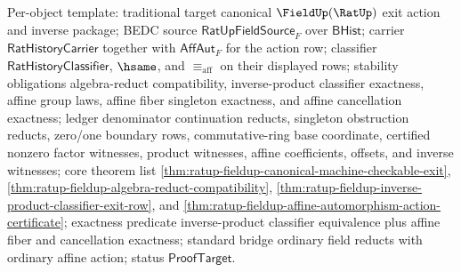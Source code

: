 Per-object template: traditional target canonical $\FieldUp(\RatUp)$ exit action
and inverse package; BEDC source $\mathsf{RatUpFieldSource}_F$ over
$\mathsf{BHist}$; carrier $\mathsf{RatHistoryCarrier}$ together with
$\mathsf{AffAut}_F$ for the action row; classifier
$\mathsf{RatHistoryClassifier}$, $\hsame$, and $\equiv_{\mathrm{aff}}$ on their
displayed rows; stability obligations algebra-reduct compatibility,
inverse-product classifier exactness, affine group laws, affine fiber
singleton exactness, and affine cancellation exactness; ledger denominator
continuation reducts, singleton obstruction reducts, zero/one boundary rows,
commutative-ring base coordinate, certified nonzero factor witnesses, product
witnesses, affine coefficients, offsets, and inverse witnesses; core theorem
list \autoref{thm:ratup-fieldup-canonical-machine-checkable-exit},
\autoref{thm:ratup-fieldup-algebra-reduct-compatibility},
\autoref{thm:ratup-fieldup-inverse-product-classifier-exit-row}, and
\autoref{thm:ratup-fieldup-affine-automorphism-action-certificate}; exactness
predicate inverse-product classifier equivalence plus affine fiber and
cancellation exactness; standard bridge ordinary field reducts with ordinary
affine action; status $\mathsf{ProofTarget}$.

